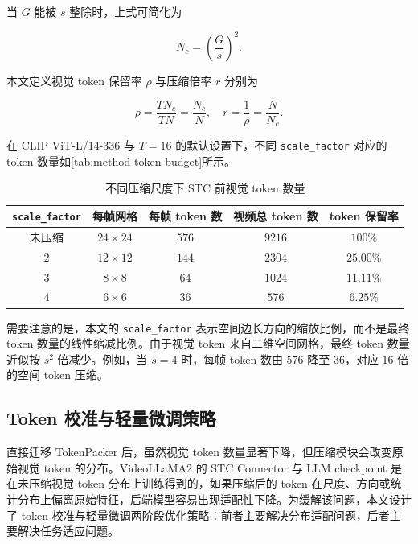 \par 当 $G$ 能被 $s$ 整除时，上式可简化为

\begin{equation}
    \label{equ:method-compressed-token-count-simple}
    N_c = \left(\frac{G}{s}\right)^2.
\end{equation}

\par 本文定义视觉 token 保留率 $\rho$ 与压缩倍率 $r$ 分别为

\begin{equation}
    \label{equ:method-compression-ratio}
    \rho = \frac{T N_c}{T N} = \frac{N_c}{N},\quad
    r = \frac{1}{\rho} = \frac{N}{N_c}.
\end{equation}

\par 在 CLIP ViT-L/14-336 与 $T=16$ 的默认设置下，不同 \texttt{scale\_factor} 对应的 token 数量如\autoref{tab:method-token-budget}所示。

\begin{table}[!htbp]
    \centering
    \caption{\label{tab:method-token-budget}不同压缩尺度下 STC 前视觉 token 数量}
    \begin{tabular}{c c c c c}
        \toprule
        \texttt{scale\_factor} & 每帧网格 & 每帧 token 数 & 视频总 token 数 & token 保留率 \\
        \midrule
        未压缩 & $24\times24$ & $576$ & $9216$ & $100\%$ \\
        $2$ & $12\times12$ & $144$ & $2304$ & $25.00\%$ \\
        $3$ & $8\times8$ & $64$ & $1024$ & $11.11\%$ \\
        $4$ & $6\times6$ & $36$ & $576$ & $6.25\%$ \\
        \bottomrule
    \end{tabular}
\end{table}

\par 需要注意的是，本文的 \texttt{scale\_factor} 表示空间边长方向的缩放比例，而不是最终 token 数量的线性缩减比例。由于视觉 token 来自二维空间网格，最终 token 数量近似按 $s^2$ 倍减少。例如，当 $s=4$ 时，每帧 token 数由 $576$ 降至 $36$，对应 $16$ 倍的空间 token 压缩。

\subsection{Token 校准与轻量微调策略}

\par 直接迁移 TokenPacker 后，虽然视觉 token 数量显著下降，但压缩模块会改变原始视觉 token 的分布。VideoLLaMA2 的 STC Connector 与 LLM checkpoint 是在未压缩视觉 token 分布上训练得到的，如果压缩后的 token 在尺度、方向或统计分布上偏离原始特征，后端模型容易出现适配性下降。为缓解该问题，本文设计了 token 校准与轻量微调两阶段优化策略：前者主要解决分布适配问题，后者主要解决任务适应问题。

